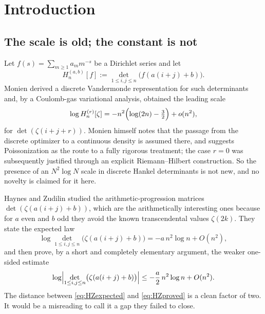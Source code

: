 \documentclass[11pt]{amsart}
\numberwithin{equation}{section}
\theoremstyle{plain}
\theoremstyle{definition}
\theoremstyle{remark}
\begin{document}
\maketitle

\section{Introduction}

\subsection{The scale is old; the constant is not}

Let $f(s)=\sum_{m\ge1}a_{m}m^{-s}$ be a Dirichlet series and let
\[
H_{n}^{(a,b)}[f]:=\det_{1\le i,j\le n}\bigl(f(a(i+j)+b)\bigr).
\]
Monien \cite{Monien2009} derived a discrete Vandermonde representation for such determinants and,
by a Coulomb-gas variational analysis, obtained the leading scale
\begin{equation}
\log H_{n}^{(r)}[\zeta]=-n^{2}\Bigl(\log (2n)-\tfrac32\Bigr)+o(n^{2}),
\label{eq:monien}
\end{equation}
for $\det(\zeta(i+j+r))$. Monien himself notes that the passage from the discrete optimizer to a
continuous density is assumed there, and suggests Poissonization as the route to a fully rigorous
treatment; the case $r=0$ was subsequently justified through an explicit Riemann--Hilbert
construction. So the presence of an $N^{2}\log N$ scale in discrete Hankel determinants is not new,
and no novelty is claimed for it here.

Haynes and Zudilin \cite{HaynesZudilin2015} studied the arithmetic-progression matrices
$\det(\zeta(a(i+j)+b))$, which are the arithmetically interesting ones because for $a$ even and $b$
odd they avoid the known transcendental values $\zeta(2k)$. They state the expected law
\begin{equation}
\log\det_{1\le i,j\le n}\bigl(\zeta(a(i+j)+b)\bigr)=-a\,n^{2}\log n+O(n^{2}),
\label{eq:HZexpected}
\end{equation}
and then prove, by a short and completely elementary argument, the weaker one-sided estimate
\begin{equation}
\log\Bigl|\det_{1\le i,j\le n}\bigl(\zeta(a(i+j)+b)\bigr)\Bigr|\le-\frac a2\,n^{2}\log n+O(n^{2}).
\label{eq:HZproved}
\end{equation}
The distance between \eqref{eq:HZexpected} and \eqref{eq:HZproved} is a clean factor of two.
It would be a misreading to call it a gap they failed to close.
\end{document}
